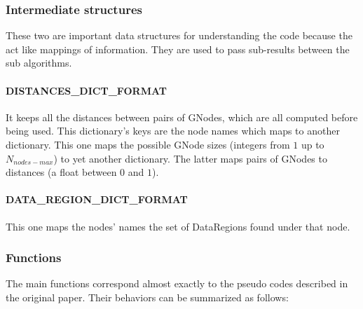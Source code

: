 \documentclass[10pt]{article}
\newcommand{\maxnodes}{N_{nodes-max}}
\begin{document}
\subsubsection{Intermediate structures}

These two are important data structures for understanding the code because the act like mappings of information. They are used to pass sub-results between the sub algorithms.

\paragraph{DISTANCES\_DICT\_FORMAT} It keeps all the distances between pairs of GNodes, which are all computed before being used. This dictionary's keys are the node names which maps to another dictionary. This one maps the possible GNode sizes (integers from $1$ up to $\maxnodes$) to yet another dictionary. The latter maps pairs of GNodes to distances (a float between $0$ and $1$).

\paragraph{DATA\_REGION\_DICT\_FORMAT} This one maps the nodes' names the set of DataRegions found under that node.



\subsubsection{Functions} \label{txt:functions}

The main functions correspond almost exactly to the pseudo codes described in the original paper. Their behaviors can be summarized as follows:
\end{document}
